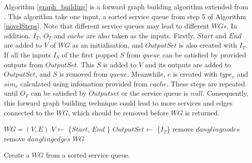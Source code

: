 \documentclass{llncs}
\begin{document}
\vspace{-0.5cm}
Algorithm  \ref{graph_building} is a forward graph building algorithm extended from \cite{blum1997fast}. This algorithm take one input, a sorted service queue from step 5 of Algorithm \ref{novelSteps}. Note that different service queues may lead to different $WGs$. In addition. $I_{T}$, $O_{T}$ and $cache$ are also taken as the inputs. Firstly, $Start$ and $End$ are added to $V$ of $WG$ as an initialisation, and $OutputSet$ is also created with $I_{T}$.  If all the inputs $I_{S}$ of the first popped  $S$ from $queue$ can be satisfied by provided outputs from $OutputSet$. This $S$ is added to $V$ and its outputs are added to $OutputSet$, and $S$ is removed from $queue$. Meanwhile, $e$ is created with $type_e$ and $sim_e$ calculated using infomation provided from $cache$. These steps are repeated until $O_{T}$ can be satisfied by $Outputset$ or the service queue is $null$. Consequently, this forward graph building technique could lead to more services and edges connected to the $WG$, which should be removed before $WG$ is returned.
\vspace{-0.5cm}

\begin{algorithm}
 \SetNlSty{}{}{:}
 $WG = (V, E)$\;
 $V \leftarrow$ \{$Start$, $End$ \} \;
 $OutputSet \leftarrow$ \{$I_{T}$\}\;
 remove $dangling nodes$\; 
 remove $dangling edges$\;
 \KwRet $WG$\;
 \caption{Create a $WG$ from a sorted service queue.}
\label{graph_building}
\end{algorithm} 

\vspace{-1.2cm}
\end{document}
